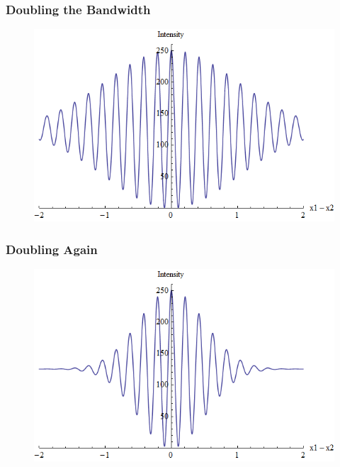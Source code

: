 \begin{frame}
    \frametitle{Doubling the Bandwidth}

    \begin{figure}
        \includegraphics[height=0.65\textheight]{figures/Interference2.png}
    \end{figure}

\end{frame}



\begin{frame}
    \frametitle{Doubling Again}

    \begin{figure}
        \includegraphics[height=0.65\textheight]{figures/Interference3.png}
    \end{figure}

\end{frame}


